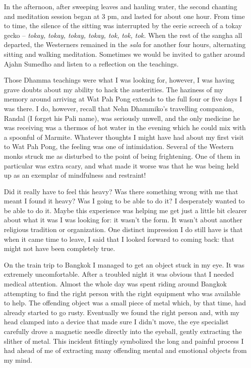 In the afternoon, after sweeping leaves and hauling water, the second
chanting and meditation session began at 3 pm, and lasted for about one
hour. From time to time, the silence of the sitting was interrupted by
the eerie screech of a tokay gecko\cite{gecko} --
\emph{tokay, tokay, tokay, tokay, tok, tok, tok.}
When the rest of the sangha all departed, the
Westerners remained in the \emph{sala} for another four hours,
alternating sitting and walking meditation. Sometimes we would be
invited to gather around Ajahn Sumedho and listen to a reflection on the
teachings.

Those Dhamma teachings were what I was looking for, however, I was
having grave doubts about my ability to hack the austerities. The
haziness of my memory around arriving at Wat Pah Pong extends to the
full four or five days I was there. I do, however, recall that Nehn
Dhammiko's travelling companion, Randal (I forget his Pali name), was
seriously unwell, and the only medicine he was receiving was a thermos
of hot water in the evening which he could mix with a spoonful of
Marmite. Whatever thoughts I might have had about my first visit to Wat
Pah Pong, the feeling was one of intimidation. Several of the Western
monks struck me as disturbed to the point of being frightening. One of
them in particular was extra scary, and what made it worse was that he
was being held up as an exemplar of mindfulness and restraint!

Did it really have to feel this heavy? Was there something wrong with me
that meant I found it heavy? Was I going to be able to do it? I
desperately wanted to be able to do it. Maybe this experience was
helping me get just a little bit clearer about what it was I was looking
for: it wasn't the form. It wasn't about another religious tradition or
organization. One distinct impression I do still have is that when it
came time to leave, I said that I looked forward to coming back: that
might not have been completely true.

On the train trip to Bangkok I managed to get an object stuck in my eye.
It was extremely uncomfortable. After a troubled night it was obvious
that I needed medical attention. Almost the whole day was spent riding
around Bangkok attempting to find the right person with the right
equipment who was available to help. The offending object was a small
piece of metal which, by that time, had already started to go rusty.
Eventually we found the right person and, with my head clamped into a
device that made sure I didn't move, the eye specialist carefully drove
a magnetic needle directly into the eyeball, gently extracting the
slither of metal. This incident fittingly symbolized the long and
painful process I had ahead of me of extracting many offending mental
and emotional objects from my mind.

